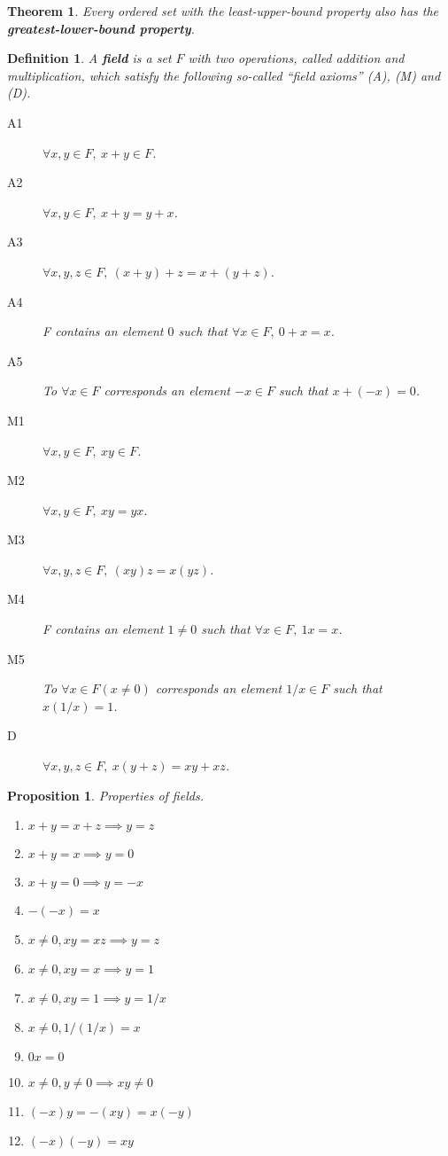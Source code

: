\documentclass[aps,pra,onecolumn,notitlepage,superscriptaddress]{revtex4-1}
\newtheorem{theo}{Theorem}
\newtheorem{prop}{Proposition}
\newtheorem{defi}{Definition}
\begin{document}
    \begin{theo}
        Every ordered set with the least-upper-bound property also has the \textbf{greatest-lower-bound property}.
    \end{theo}
    
    \begin{defi}
        A \textbf{field} is a set $F$ with two operations, called addition and multiplication, which satisfy the following so-called ``field axioms'' (A), (M) and (D).
        \begin{description}
            \item[A1] $\forall x, y \in F, \ x+y \in F$.
            \item[A2] $\forall x,y \in F, \ x+y=y+x$.
            \item[A3] $\forall x,y,z \in F, \ (x+y)+z=x+(y+z)$.
            \item[A4] F contains an element $0$ such that $\forall x\in F, \ 0 + x = x$.
            \item[A5] To $\forall x \in F$ corresponds an element $-x \in F$ such that $x + (-x) = 0$.
            \item[M1] $\forall x, y \in F, \ xy \in F$.
            \item[M2] $\forall x,y \in F, \ xy=yx$.
            \item[M3] $\forall x,y,z \in F, \ (xy)z=x(yz)$.
            \item[M4] F contains an element $1 \neq 0$ such that $\forall x\in F, \ 1x = x$.
            \item[M5] To $\forall x \in F (x \neq 0)$ corresponds an element $1/x \in F$ such that $x (1/x) = 1$.
            \item[D] $\forall x,y,z \in F, \ x(y+z)=xy+xz$.
        \end{description}
    \end{defi}
    \begin{prop} Properties of fields.
        \begin{enumerate}
            \item $x+y=x+z \implies y=z$
            \item $x+y=x \implies y=0$
            \item $x+y=0 \implies y=-x$
            \item $-(-x)=x$
            \item $x \neq 0, xy=xz \implies y=z$
            \item $x \neq 0, xy=x \implies y=1$
            \item $x \neq 0, xy=1 \implies y=1/x$
            \item $x \neq 0, 1/(1/x) = x$
            \item $0x = 0$
            \item $x \neq 0, y \neq 0 \implies xy \neq 0$
            \item $(-x)y=-(xy)=x(-y)$
            \item $(-x)(-y)=xy$
        \end{enumerate}
    \end{prop}
\end{document}
